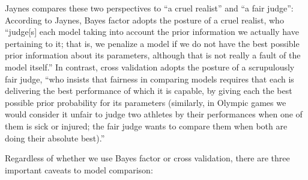 \documentclass[12pt,]{krantz}
\theoremstyle{definition}
\theoremstyle{definition}
\theoremstyle{definition}
\theoremstyle{remark}
\begin{document}
Jaynes \citeyearpar[chapter 20]{jaynes2003probability} compares these
two perspectives to ``a cruel realist'' and ``a fair judge'': According
to Jaynes, Bayes factor adopts the posture of a cruel realist, who
``judge{[}s{]} each model taking into account the prior information we
actually have pertaining to it; that is, we penalize a model if we do
not have the best possible prior information about its parameters,
although that is not really a fault of the model itself.'' In contrast,
cross validation adopts the posture of a scrupulously fair judge, ``who
insists that fairness in comparing models requires that each is
delivering the best performance of which it is capable, by giving each
the best possible prior probability for its parameters (similarly, in
Olympic games we would consider it unfair to judge two athletes by their
performances when one of them is sick or injured; the fair judge wants
to compare them when both are doing their absolute best).''

Regardless of whether we use Bayes factor or cross validation, there are
three important caveats to model comparison:
\end{document}
